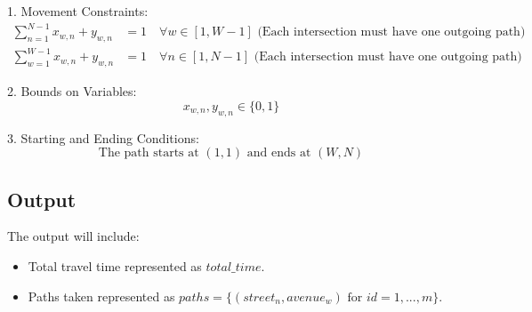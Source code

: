 \documentclass{article}
\begin{document}
1. Movement Constraints:
    \begin{align*}
    \sum_{n=1}^{N-1} x_{w,n} + y_{w,n} & = 1 \quad \forall w \in [1, W-1] \text{ (Each intersection must have one outgoing path)} \\
    \sum_{w=1}^{W-1} x_{w,n} + y_{w,n} & = 1 \quad \forall n \in [1, N-1] \text{ (Each intersection must have one outgoing path)}
    \end{align*}

2. Bounds on Variables:
    \[
    x_{w,n}, y_{w,n} \in \{0, 1\}
    \]

3. Starting and Ending Conditions:
   \[
   \text{The path starts at } (1, 1) \text{ and ends at } (W, N)
   \]

\subsection*{Output}

The output will include:
\begin{itemize}
    \item Total travel time represented as \( total\_time \).
    \item Paths taken represented as \( paths = \{(street_{n}, avenue_{w}) \text{ for } id = 1,..., m\} \).
\end{itemize}
\end{document}
